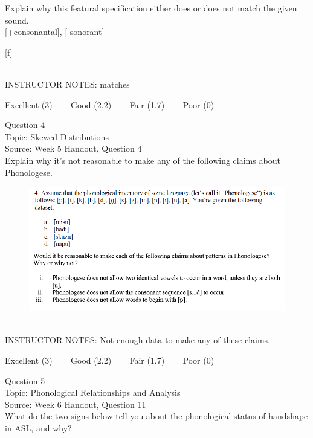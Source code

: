 \documentclass[12pt]{article}
\begin{document}
Explain why this featural specification either does or does not match the given sound.\\

{[+consonantal]}, {[-sonorant]}

{[f]}


~\\
INSTRUCTOR NOTES: matches


\vfill
Excellent (3) ~~~ Good (2.2) ~~~ Fair (1.7) ~~~ Poor (0)
\newpage

{\large Question 4}\\

Topic: Skewed Distributions\\
Source: Week 5 Handout, Question 4\\

Explain why it's not reasonable to make any of the following claims about Phonologese.\\

\begin{figure}[H]
\includegraphics{../images/Phonologese.png}
\end{figure}

~\\
INSTRUCTOR NOTES: Not enough data to make any of these claims.


\vfill
Excellent (3) ~~~ Good (2.2) ~~~ Fair (1.7) ~~~ Poor (0)
\newpage

{\large Question 5}\\

Topic: Phonological Relationships and Analysis\\
Source: Week 6 Handout, Question 11\\

What do the two signs below tell you about the phonological status of \underline{handshape} in ASL, and why?\\
\end{document}
